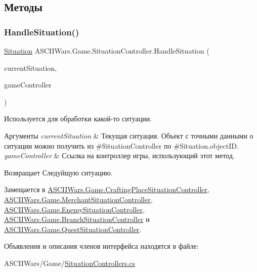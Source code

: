 \subsection{Методы}
\hypertarget{interface_a_s_c_i_i_wars_1_1_game_1_1_situation_controller_a2cf0359dfc1683beb63f0dfed1c372e6}{}\label{interface_a_s_c_i_i_wars_1_1_game_1_1_situation_controller_a2cf0359dfc1683beb63f0dfed1c372e6} 
\subsubsection{\texorpdfstring{Handle\+Situation()}{HandleSituation()}}
{\footnotesize\ttfamily \hyperlink{class_a_s_c_i_i_wars_1_1_game_1_1_situation}{Situation} A\+S\+C\+I\+I\+Wars.\+Game.\+Situation\+Controller.\+Handle\+Situation (\begin{DoxyParamCaption}\item[{\hyperlink{class_a_s_c_i_i_wars_1_1_game_1_1_situation}{Situation}}]{current\+Situation,  }\item[{\hyperlink{class_a_s_c_i_i_wars_1_1_game_1_1_game_controller}{Game\+Controller}}]{game\+Controller }\end{DoxyParamCaption})}



Используется для обработки какой-\/то ситуации. 


\begin{DoxyParams}{Аргументы}
{\em current\+Situation} & Текущая ситуация. Объект с точными данными о ситуации можно получить из \#\+Situation\+Controller по \#\+Situation.\+object\+ID. \\
\hline
{\em game\+Controller} & Ссылка на контроллер игры, использующий этот метод. \\
\hline
\end{DoxyParams}
\begin{DoxyReturn}{Возвращает}
Следуйщую ситуацию. 
\end{DoxyReturn}


Замещается в \hyperlink{class_a_s_c_i_i_wars_1_1_game_1_1_crafting_place_situation_controller_a7e9f8549aa179c520a21039882cea3d7}{A\+S\+C\+I\+I\+Wars.\+Game.\+Crafting\+Place\+Situation\+Controller}, \hyperlink{class_a_s_c_i_i_wars_1_1_game_1_1_merchant_situation_controller_a4048d09077a393377801bf3f3697115b}{A\+S\+C\+I\+I\+Wars.\+Game.\+Merchant\+Situation\+Controller}, \hyperlink{class_a_s_c_i_i_wars_1_1_game_1_1_enemy_situation_controller_a90db7af0d04e0ca4ee9231f63c0a6dd3}{A\+S\+C\+I\+I\+Wars.\+Game.\+Enemy\+Situation\+Controller}, \hyperlink{class_a_s_c_i_i_wars_1_1_game_1_1_branch_situation_controller_abf7662c8744efb91a97ad3aa382f47c7}{A\+S\+C\+I\+I\+Wars.\+Game.\+Branch\+Situation\+Controller} и \hyperlink{class_a_s_c_i_i_wars_1_1_game_1_1_quest_situation_controller_aca719e6a0e79c492e212358b0bb0bc24}{A\+S\+C\+I\+I\+Wars.\+Game.\+Quest\+Situation\+Controller}.



Объявления и описания членов интерфейса находятся в файле\+:\begin{DoxyCompactItemize}
\item 
A\+S\+C\+I\+I\+Wars/\+Game/\hyperlink{_situation_controllers_8cs}{Situation\+Controllers.\+cs}\end{DoxyCompactItemize}
